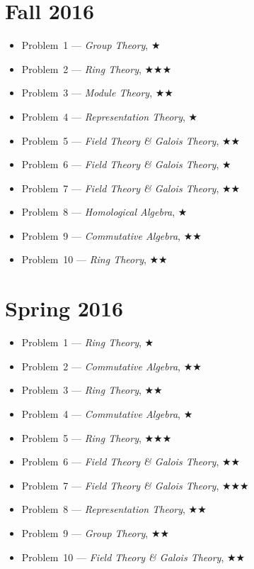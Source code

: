 \documentclass[11pt,letterpaper]{book}
\begin{document}
\section*{Fall 2016}
\begin{itemize}
\item Problem~1 --- \textit{Group Theory}, $\bigstar$
\item Problem~2 --- \textit{Ring Theory}, $\bigstar\bigstar\bigstar$
\item Problem~3 --- \textit{Module Theory}, $\bigstar\bigstar$
\item Problem~4 --- \textit{Representation Theory}, $\bigstar$
\item Problem~5 --- \textit{Field Theory \& Galois Theory}, $\bigstar\bigstar$
\item Problem~6 --- \textit{Field Theory \& Galois Theory}, $\bigstar$
\item Problem~7 --- \textit{Field Theory \& Galois Theory}, $\bigstar\bigstar$
\item Problem~8 --- \textit{Homological Algebra}, $\bigstar$
\item Problem~9 --- \textit{Commutative Algebra}, $\bigstar\bigstar$
\item Problem~10 --- \textit{Ring Theory}, $\bigstar\bigstar$
\end{itemize}

\section*{Spring 2016}
\begin{itemize}
\item Problem~1 --- \textit{Ring Theory}, $\bigstar$
\item Problem~2 --- \textit{Commutative Algebra}, $\bigstar\bigstar$
\item Problem~3 --- \textit{Ring Theory}, $\bigstar\bigstar$
\item Problem~4 --- \textit{Commutative Algebra}, $\bigstar$
\item Problem~5 --- \textit{Ring Theory}, $\bigstar\bigstar\bigstar$
\item Problem~6 --- \textit{Field Theory \& Galois Theory}, $\bigstar\bigstar$
\item Problem~7 --- \textit{Field Theory \& Galois Theory}, $\bigstar\bigstar\bigstar$
\item Problem~8 --- \textit{Representation Theory}, $\bigstar\bigstar$
\item Problem~9 --- \textit{Group Theory}, $\bigstar\bigstar$
\item Problem~10 --- \textit{Field Theory \& Galois Theory}, $\bigstar\bigstar$
\end{itemize}
\end{document}

